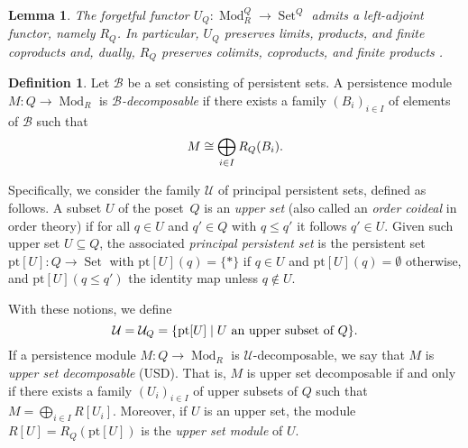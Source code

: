 \documentclass[oneside]{amsart}
\newtheorem{lemma}[theorem]{Lemma}
\theoremstyle{definition}
\newtheorem{definition}[theorem]{Definition}
\newcommand\Set{\operatorname{Set}}
\newcommand\Mod[1]{\operatorname{Mod}_{#1}}
\newcommand\pt{\mathrm{pt}}
\begin{document}
\begin{lemma}
    The forgetful functor $U_{Q}\colon \Mod{R}^{Q} \to \Set^{Q}$ admits a left-adjoint functor, namely $R_{Q}$.
    In particular, $U_{Q}$ preserves limits, products, and finite coproducts and, dually, $R_{Q}$ preserves colimits, coproducts, and finite products \cite{MacLane1978}.
\end{lemma}

\begin{definition}
    Let $\mathcal B$ be a set consisting of persistent sets.
    A persistence module~$M\colon Q \to \Mod{R}$ is \emph{$\mathcal B$-decomposable} if there exists a family $(B_i)_{i \in I}$ of elements of $\mathcal B$ such that
    \[ M \cong \bigoplus_{i \in I} \mathop{R_{Q}}(B_i) \text. \]
\end{definition}

Specifically, we consider the family $\mathcal U$ of principal persistent sets, defined as follows.
A subset $U$ of the poset~$Q$ is an \emph{upper set} (also called an \emph{order coideal} in order theory) if for all $q \in U$ and $q' \in Q$ with $q \leq q'$ it follows $q' \in U$.
Given such upper set $U \subseteq Q$, the associated \emph{principal persistent set} is the persistent set $\pt[U]\colon Q \to \Set$ with $\pt[U](q) = \{ \ast \}$ if $q \in U$ and $\pt[U](q) = \emptyset$ otherwise, and $\pt[U](q \leq q')$ the identity map unless $q \notin U$.

With these notions, we define
\[ \mathcal U = \mathcal U_{Q} = \{ \pt[U] \mid \text{$U$ an upper subset of $Q$} \} \text. \]
If a persistence module $M\colon Q \to \Mod{R}$ is $\mathcal U$-decomposable, we say that $M$ is \emph{upper set decomposable} (USD).
That is, $M$ is upper set decomposable if and only if there exists a family $(U_i)_{i \in I}$ of upper subsets of $Q$ such that $M = \bigoplus_{i \in I} R[U_i]$.
Moreover, if $U$ is an upper set, the module $R[U] = R_{Q}(\pt[U])$ is the \emph{upper set module} of $U$.
\end{document}
